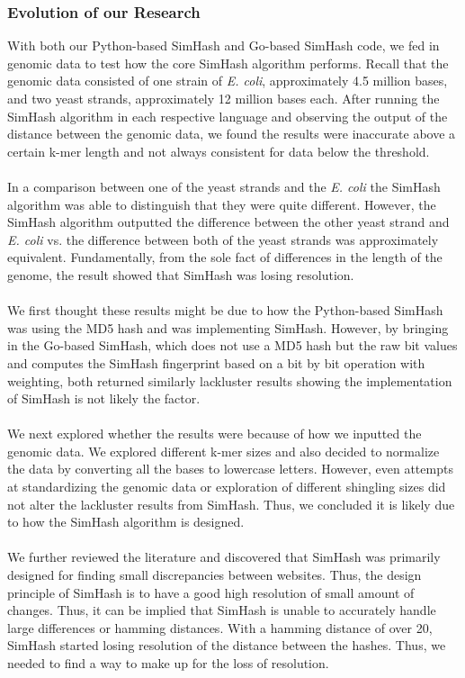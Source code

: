 \documentclass[12pt, letterpaper]{article}
\begin{document}
\subsubsection{Evolution of our Research}
With both our Python-based SimHash and Go-based SimHash code, we fed in genomic data to test how the core SimHash algorithm performs. Recall that the genomic data consisted of one strain of \textit{E. coli}, approximately 4.5 million bases, and two yeast strands, approximately 12 million bases each. After running the SimHash algorithm in each respective language and observing the output of the distance between the genomic data, we found the results were inaccurate above a certain k-mer length and not always consistent for data below the threshold. \\ \\
In a comparison between one of the yeast strands and the \textit{E. coli} the SimHash algorithm was able to distinguish that they were quite different. However, the SimHash algorithm outputted the difference between the other yeast strand and \textit{E. coli} vs. the difference between both of the yeast strands was approximately equivalent. Fundamentally, from the sole fact of differences in the length of the genome, the result showed that SimHash was losing resolution. \\ \\
We first thought these results might be due to how the Python-based SimHash was using the MD5 hash and was implementing SimHash. However, by bringing in the Go-based SimHash, which does not use a MD5 hash but the raw bit values and computes the SimHash fingerprint based on a bit by bit operation with weighting, both returned similarly lackluster results showing the implementation of SimHash is not likely the factor.  \\ \\
We next explored whether the results were because of how we inputted the genomic data. We explored different k-mer sizes and also decided to normalize the data by converting all the bases to lowercase letters. However, even attempts at standardizing the genomic data or exploration of different shingling sizes did not alter the lackluster results from SimHash. Thus, we concluded it is likely due to how the SimHash algorithm is designed. \\ \\
We further reviewed the literature and discovered that SimHash was primarily designed for finding small discrepancies between websites. Thus, the design principle of SimHash is to have a good high resolution of small amount of changes. Thus, it can be implied that SimHash is unable to accurately handle large differences or hamming distances. With a hamming distance of over 20, SimHash started losing resolution of the distance between the hashes. Thus, we needed to find a way to make up for the loss of resolution.
\end{document}
